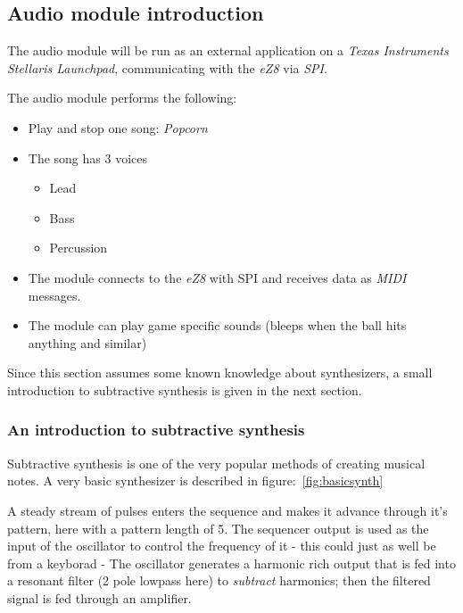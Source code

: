 \subsection{Audio module introduction}
The audio module will be run as an external application on a \emph{Texas
Instruments} \emph{Stellaris Launchpad}, communicating with the \emph{eZ8} via
\emph{SPI}.

The audio module performs the following:
\begin{itemize}
  \item Play and stop one song: \emph{Popcorn}
  \item The song has 3 voices
  \begin{itemize}
    \item Lead
    \item Bass
    \item Percussion
  \end{itemize}
  \item The module connects to the \emph{eZ8} with SPI and receives data as
  \emph{MIDI} messages.
  \item The module can play game specific sounds (bleeps when the ball hits
  anything and similar)
\end{itemize}

Since this section assumes some known knowledge about synthesizers, a small
introduction to subtractive synthesis is given in the next section.

\subsubsection{An introduction to subtractive synthesis}
Subtractive synthesis is one of the very popular methods of creating musical
notes. A very basic synthesizer is described in figure:~\ref{fig:basicsynth}


A steady stream of pulses enters the sequence and makes it advance through it's
pattern, here with a pattern length of 5. The sequencer output is used as the
input of the oscillator to control the frequency of it - this could just as well
be from a keyborad - The oscillator generates a harmonic rich output that is fed
into a resonant filter (2 pole lowpass here) to \emph{subtract} harmonics; then
the filtered signal is fed through an amplifier.

